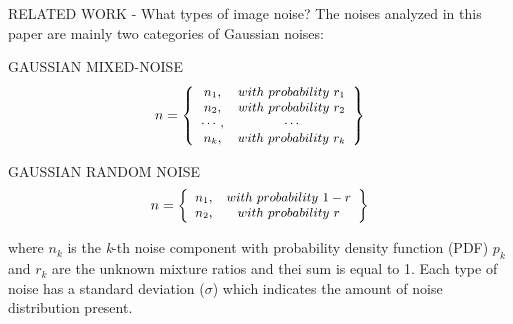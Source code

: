 \begin{frame}{RELATED WORK - What types of image noise?}
    The noises analyzed in this paper are mainly two categories of Gaussian 
    noises:
    \begin{minipage}{\linewidth}
        \centering
        \begin{minipage}{0.45\linewidth}
            \begin{block}{GAUSSIAN MIXED-NOISE}
                $$
                \small
                n = \left\{
                    \begin{array}{cc}
                        n_1, & with~probability~r_1\\
                        n_2, & with~probability~r_2\\
                        \cdots, & \cdots\\
                        n_k, & with~probability~r_k\\ 
                    \end{array}
                    \right\}
                $$
            \end{block}  
        \end{minipage}
        \hspace{0.05\linewidth}
        \begin{minipage}{0.47\linewidth}
            \begin{block}{GAUSSIAN RANDOM NOISE}
                $$
                \small
                n = \left\{
                    \begin{array}{cc}
                        n_1, & with~probability~1-r\\
                        n_2, & with~probability~r\\
                    \end{array}
                    \right\}
                $$
            \end{block} 
        \end{minipage}
    \end{minipage}
    where $ n_k $ is the \emph{k}-th noise component with probability density function (PDF) 
    $ p_k $ and $ r_k $ are the unknown mixture ratios and thei sum is equal to 
    1. Each type of noise has a standard deviation ($\sigma$) which indicates the 
    amount of noise distribution present.     
\end{frame}

